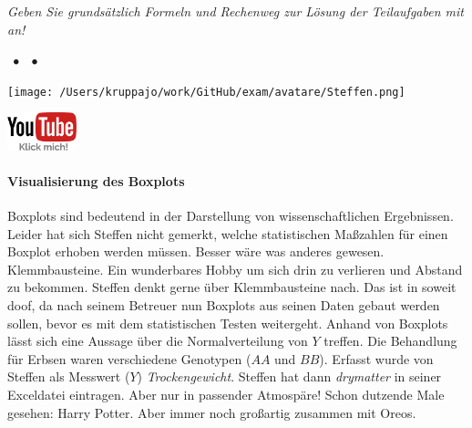 \documentclass[a4paper, 9pt]{scrartcl}\usepackage[]{graphicx}\usepackage[]{xcolor}
\begin{document}
\textit{Geben Sie grundsätzlich Formeln und Rechenweg zur Lösung der Teilaufgaben mit an!} \\[1Ex]
 

 
\ifcollection
\begin{flushright}
\tiny\vspace{-3Ex}
\textbf{\examinhaltstart}
\exammodulemathstat $\;\bullet$
\exammodulestat $\;\bullet$
\exammodulestatbbv 
\vspace{-4Ex}
\end{flushright}
\begin{minipage}[t]{0.5\textwidth}
\texttt{[image: /Users/kruppajo/work/GitHub/exam/avatare/Steffen.png]}
\end{minipage}
\begin{minipage}[t]{0.5\textwidth}
\hfill
\href{https://youtu.be/0xc0jIPeiyw}{\includegraphics[width = 2cm]{img/youtube}}
\end{minipage}
\vspace{-3ex}
\fi



\ifcollection
\paragraph{Visualisierung des Boxplots}
\fi

Boxplots sind bedeutend in der Darstellung von wissenschaftlichen Ergebnissen. Leider hat sich Steffen nicht gemerkt, welche statistischen Maßzahlen für einen Boxplot erhoben werden müssen. Besser wäre was anderes gewesen. Klemmbausteine. Ein wunderbares Hobby um sich drin zu verlieren und Abstand zu bekommen. Steffen denkt gerne über Klemmbausteine nach. Das ist in soweit doof, da nach seinem Betreuer nun Boxplots aus seinen Daten gebaut werden sollen, bevor es mit dem statistischen Testen weitergeht. Anhand von Boxplots lässt sich eine Aussage über die Normalverteilung von $Y$ treffen. Die Behandlung für Erbsen waren verschiedene Genotypen ($AA$ und $BB$). Erfasst wurde von Steffen als Messwert ($Y$) \textit{Trockengewicht}. Steffen hat dann \textit{drymatter} in seiner Exceldatei eintragen. Aber nur in passender Atmospäre! Schon dutzende Male gesehen: Harry Potter. Aber immer noch großartig zusammen mit Oreos.
\end{document}
